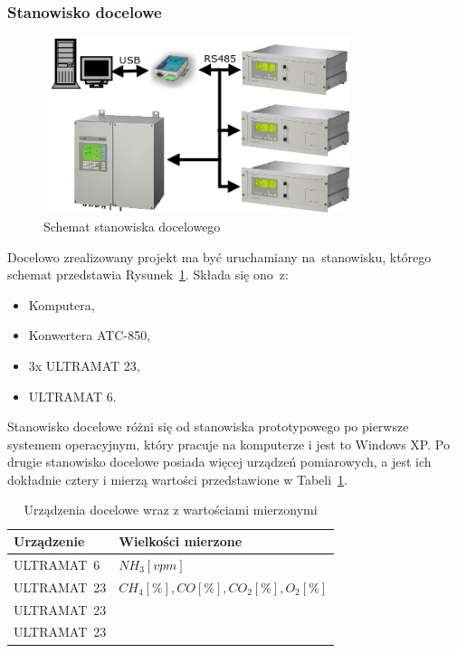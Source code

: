 \subsubsection{Stanowisko docelowe}
\begin{figure}[!htb] 	\centering 	\includegraphics[width=0.8\textwidth]{images/schemat2} 	\caption{Schemat stanowiska docelowego} \label{schemat2} \end{figure} 
Docelowo zrealizowany projekt ma być uruchamiany na~stanowisku, którego schemat przedstawia Rysunek~\ref{schemat2}. Składa się ono~z:
\begin{itemize}
\item Komputera,
\item Konwertera ATC-850,
\item 3x ULTRAMAT 23,
\item ULTRAMAT 6.
\end{itemize}
\indent
\indent Stanowisko docelowe różni się od stanowiska prototypowego po pierwsze systemem operacyjnym, który pracuje na komputerze i jest to Windows XP. Po drugie stanowisko docelowe posiada więcej urządzeń pomiarowych, a jest ich dokładnie cztery i mierzą wartości przedstawione w Tabeli~\ref{tab:docelowe}.

\begin{table}[h]
\centering
\begin{tabular}{|l|l|}
\hline Urządzenie & Wielkości mierzone \\ 
\hline ULTRAMAT~6 & $ NH_3 [vpm] $ \\ 
\hline ULTRAMAT~23 & $ CH_4 [\%], CO [\%], CO_2 [\%], O_2 [\%] $ \\ 
\hline ULTRAMAT~23 & $  $ \\ 
\hline ULTRAMAT~23 & $  $ \\ 
\hline 
\end{tabular} 
\caption{Urządzenia docelowe wraz z wartościami mierzonymi}
\label{tab:docelowe}
\end{table}

